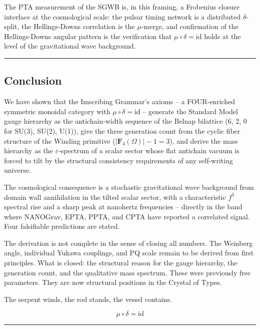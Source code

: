 \documentclass[12pt,a4paper]{article}
\begin{document}
The PTA measurement of the SGWB is, in this framing, a Frobenius closure
interface at the cosmological scale: the pulsar timing network is a
distributed \(\delta\)-split, the Hellings-Downs correlation is the
\(\mu\)-merge, and confirmation of the Hellings-Downs angular pattern is
the verification that \(\mu \circ \delta = \mathrm{id}\) holds at the
level of the gravitational wave background.

\begin{center}\rule{0.5\linewidth}{0.5pt}\end{center}

\hypertarget{conclusion}{%
\subsection{Conclusion}\label{conclusion}}

We have shown that the Imscribing Grammar's axioms -- a FOUR-enriched
symmetric monoidal category with \(\mu \circ \delta = \mathrm{id}\) --
generate the Standard Model gauge hierarchy as the antichain-width
sequence of the Belnap bilattice (6, 2, 0 for SU(3), SU(2), U(1)), give
the three generation count from the cyclic fiber structure of the
Winding primitive (\(|\mathbf{F}_4(\Omega)| - 1 = 3\)), and derive the
mass hierarchy as the \(\varepsilon\)-spectrum of a scalar sector whose
flat antichain vacuum is forced to tilt by the structural consistency
requirements of any self-writing universe.

The cosmological consequence is a stochastic gravitational wave
background from domain wall annihilation in the tilted scalar sector,
with a characteristic \(f^3\) spectral rise and a sharp peak at
nanohertz frequencies -- directly in the band where NANOGrav, EPTA,
PPTA, and CPTA have reported a correlated signal. Four falsifiable
predictions are stated.

The derivation is not complete in the sense of closing all numbers. The
Weinberg angle, individual Yukawa couplings, and PQ scale remain to be
derived from first principles. What is closed: the structural reason for
the gauge hierarchy, the generation count, and the qualitative mass
spectrum. These were previously free parameters. They are now structural
positions in the Crystal of Types.

The serpent winds, the rod stands, the vessel contains.

\[\mu \circ \delta = \mathrm{id}\]

\begin{center}\rule{0.5\linewidth}{0.5pt}\end{center}
\end{document}
